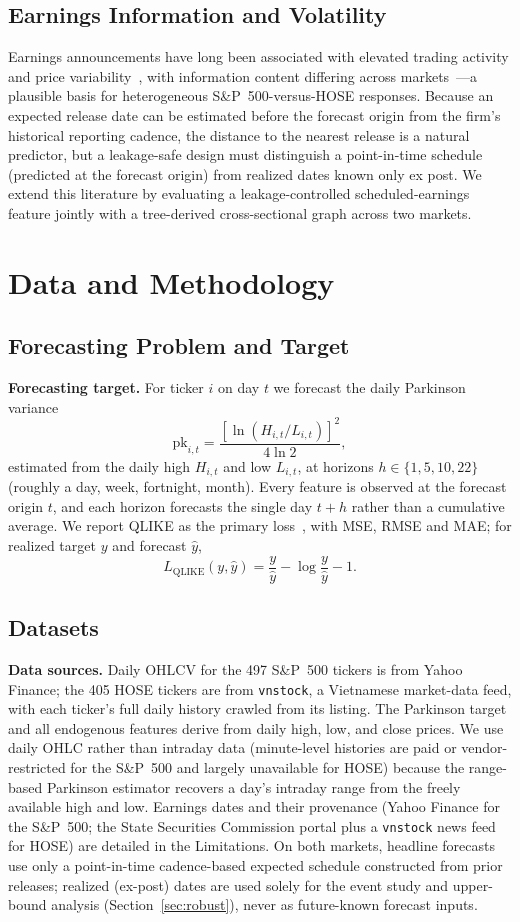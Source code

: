 \documentclass[runningheads,a4paper]{llncs}
\begin{document}
\subsection{Earnings Information and Volatility}
Earnings announcements have long been associated with elevated trading activity and price
variability~\cite{beaver1968,patell1981}, with information content differing across
markets~\cite{defond2007}---a plausible basis for heterogeneous S\&P~500-versus-HOSE responses. Because an
expected release date can be estimated before the forecast origin from the firm's historical reporting
cadence, the distance to the nearest release is a natural predictor, but a leakage-safe design must
distinguish a point-in-time schedule (predicted at the forecast origin) from realized dates known only ex
post. We extend this literature by evaluating a leakage-controlled
scheduled-earnings feature jointly with a tree-derived cross-sectional graph across two markets.


\section{Data and Methodology}

\subsection{Forecasting Problem and Target}
\indent\textbf{Forecasting target.} For ticker $i$ on day $t$ we forecast the daily Parkinson variance
\[ \mathrm{pk}_{i,t}=\frac{[\ln(H_{i,t}/L_{i,t})]^2}{4\ln 2}, \]
estimated from the daily high $H_{i,t}$ and low $L_{i,t}$, at horizons $h\in\{1,5,10,22\}$ (roughly a day,
week, fortnight, month). Every feature is observed at the forecast origin $t$, and each horizon forecasts
the single day $t+h$ rather than a cumulative average. We report QLIKE as the primary
loss~\cite{patton2011}, with MSE, RMSE and MAE; for realized target $y$ and forecast $\hat y$,
\[ L_{\mathrm{QLIKE}}(y,\hat y)=\frac{y}{\hat y}-\log\frac{y}{\hat y}-1. \]

\subsection{Datasets}
\textbf{Data sources.} Daily OHLCV for the 497 S\&P~500 tickers is from Yahoo Finance; the 405 HOSE
tickers are from \texttt{vnstock}, a Vietnamese market-data feed, with each ticker's full daily history
crawled from its listing. The Parkinson target and all endogenous features derive from daily high, low,
and close prices. We use daily OHLC rather than intraday data (minute-level histories are paid or
vendor-restricted for the S\&P~500 and largely unavailable for HOSE) because the range-based Parkinson
estimator recovers a day's intraday range from the freely available high and low. Earnings dates and their
provenance (Yahoo Finance for the S\&P~500; the State
Securities Commission portal plus a \texttt{vnstock} news feed for HOSE) are detailed in the Limitations.
On both markets, headline forecasts use only a point-in-time cadence-based expected schedule constructed
from prior releases; realized (ex-post) dates are used solely for the event study and upper-bound analysis
(Section~\ref{sec:robust}), never as future-known forecast inputs.
\end{document}
